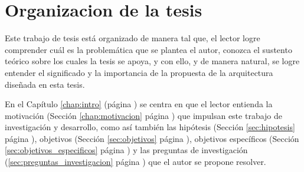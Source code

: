 \chapter*{Organizacion de la tesis}
\label{chap:organizacion}

Este trabajo de tesis está organizado de manera tal que, el lector logre comprender
cuál es la problemática que se plantea el autor, conozca el sustento
teórico sobre los cuales la tesis se apoya, y con ello,  y de manera natural, se logre
entender el significado y la importancia de la propuesta de la arquitectura diseñada
en esta tesis.

En el Capítulo \ref{chap:intro} (página \pageref{chap:intro}) se centra en que el lector
entienda la motivación (Sección \ref{chap:motivacion} página \pageref{chap:motivacion})
que impulsan este trabajo de investigación y desarrollo, como así también las
hipótesis (Sección \ref{sec:hipotesis} página \pageref{sec:hipotesis}), objetivos
(Sección \ref{sec:objetivos} página \pageref{sec:objetivos}), objetivos específicos
(Sección \ref{sec:objetivos_especificos} página \pageref{sec:objetivos_especificos}) y las
preguntas de investigación (\ref{sec:preguntas_investigacion} página \pageref{sec:preguntas_investigacion}) que el autor se propone resolver.

